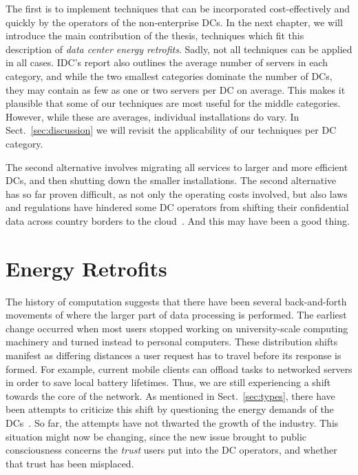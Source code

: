 \documentclass[officiallayout]{tktla}
\begin{document}
The first is to implement techniques that can be incorporated cost-effectively
and quickly by the operators of the non-enterprise DCs. In the next chapter,
we will introduce the main contribution of the thesis, techniques which fit
this description of \emph{data center energy retrofits}. Sadly, not all
techniques can be applied in all cases.  IDC's report also outlines the
average number of servers in each category, and while the two smallest
categories dominate the number of DCs, they may contain as few as one or two
servers per DC on average. This makes it plausible that some of our techniques
are most useful for the middle categories. However, while these are averages,
individual installations do vary. In Sect.~\ref{sec:discussion} we will
revisit the applicability of our techniques per DC category.

The second alternative involves migrating all services to larger and more
efficient DCs, and then shutting down the smaller installations. The second
alternative has so far proven difficult, as not only the operating costs
involved, but also laws and regulations have hindered some DC operators from
shifting their confidential data across country borders to the
cloud~\cite{Bailey2006,Gallagher2013}. And this may have been a good thing.




\chapter{Energy Retrofits}
\label{ch:retrofits}

The history of computation suggests that there have been several
back-and-forth movements of where the larger part of data processing is
performed. The earliest change occurred when most users stopped working on
university-scale computing machinery and turned instead to personal computers.
These distribution shifts manifest as differing distances a user request has
to travel before its response is formed. For example, current mobile clients
can offload tasks to networked servers in order to save local battery
lifetimes.  Thus, we are still experiencing a shift towards the core of the
network. As mentioned in Sect.~\ref{sec:types}, there have been attempts to
criticize this shift by questioning the energy demands of the
DCs~\cite{Huber1999,VanHorn2011}. So far, the attempts have not thwarted the
growth of the industry. This situation might now be changing, since the new
issue brought to public consciousness concerns the \emph{trust} users put into
the DC operators, and whether that trust has been misplaced.
\end{document}

